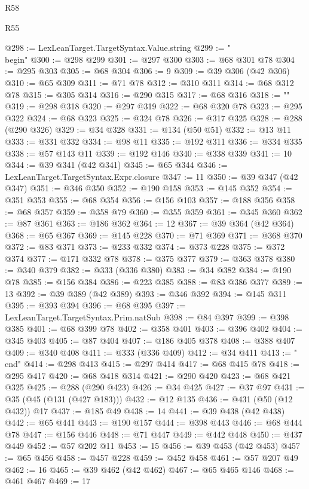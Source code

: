 \begin{lexlean}{R58}
\begin{lexlean}{R55}
\begin{coremodule}
{{{{{{{{{{{{{{{{{{{{{{{{{{{{{{{{{{{{{{{{{{{{{{{{{{{{{{{{{{{{@298 := LexLeanTarget.TargetSyntax.Value.string
@299 := "\\begin{"
@300 := @298 @299
@301 := @297 @300
@303 := @68 @301 @78
@304 := @295 @303
@305 := @68 @304
@306 := 9
@309 := @39 @306 (@42 @306)
@310 := @65 @309
@311 := @71 @78
@312 := @310 @311
@314 := @68 @312 @78
@315 := @305 @314
@316 := @290 @315
@317 := @68 @316
@318 := "}"
@319 := @298 @318
@320 := @297 @319
@322 := @68 @320 @78
@323 := @295 @322
@324 := @68 @323
@325 := @324 @78
@326 := @317 @325
@328 := @288 (@290 @326)
@329 := @34 @328
@331 := @134 (@50 @51)
@332 := @13 @11
@333 := @331 @332
@334 := @98 @11
@335 := @192 @311
@336 := @334 @335
@338 := @57 @143 @11
@339 := @192 @146
@340 := @338 @339
@341 := 10
@344 := @39 @341 (@42 @341)
@345 := @65 @344
@346 := LexLeanTarget.TargetSyntax.Expr.closure
@347 := 11
@350 := @39 @347 (@42 @347)
@351 := @346 @350
@352 := @190 @158
@353 := @145 @352
@354 := @351 @353
@355 := @68 @354
@356 := @156 @103
@357 := @188 @356
@358 := @68 @357
@359 := @358 @79
@360 := @355 @359
@361 := @345 @360
@362 := @87 @361
@363 := @186 @362
@364 := 12
@367 := @39 @364 (@42 @364)
@368 := @65 @367
@369 := @145 @228
@370 := @71 @369
@371 := @368 @370
@372 := @83 @371
@373 := @233 @332
@374 := @373 @228
@375 := @372 @374
@377 := @171 @332 @78
@378 := @375 @377
@379 := @363 @378
@380 := @340 @379
@382 := @333 (@336 @380)
@383 := @34 @382
@384 := @190 @78
@385 := @156 @384
@386 := @223 @385
@388 := @83 @386 @377
@389 := 13
@392 := @39 @389 (@42 @389)
@393 := @346 @392
@394 := @145 @311
@395 := @393 @394
@396 := @68 @395
@397 := LexLeanTarget.TargetSyntax.Prim.natSub
@398 := @84 @397
@399 := @398 @385
@401 := @68 @399 @78
@402 := @358 @401
@403 := @396 @402
@404 := @345 @403
@405 := @87 @404
@407 := @186 @405 @378
@408 := @388 @407
@409 := @340 @408
@411 := @333 (@336 @409)
@412 := @34 @411
@413 := "\\end{"
@414 := @298 @413
@415 := @297 @414
@417 := @68 @415 @78
@418 := @295 @417
@420 := @68 @418 @314
@421 := @290 @420
@423 := @68 @421 @325
@425 := @288 (@290 @423)
@426 := @34 @425
@427 := @37 @97
@431 := @35 (@45 (@131 (@427 @183)))
@432 := @12 @135
@436 := @431 (@50 (@12 @432)) @17
@437 := @185 @49
@438 := 14
@441 := @39 @438 (@42 @438)
@442 := @65 @441
@443 := @190 @157
@444 := @398 @443
@446 := @68 @444 @78
@447 := @156 @446
@448 := @71 @447
@449 := @442 @448
@450 := @437 @449
@452 := @57 @202 @11
@453 := 15
@456 := @39 @453 (@42 @453)
@457 := @65 @456
@458 := @457 @228
@459 := @452 @458
@461 := @57 @207 @49
@462 := 16
@465 := @39 @462 (@42 @462)
@467 := @65 @465 @146
@468 := @461 @467
@469 := 17
}}}}}}}}}}}}}}}}}}}}}}}}}}}}}}}}}}}}}}}}}}}}}}}}}}}}}}}}}}}}}
\end{coremodule}
\end{lexlean}
\end{lexlean}
